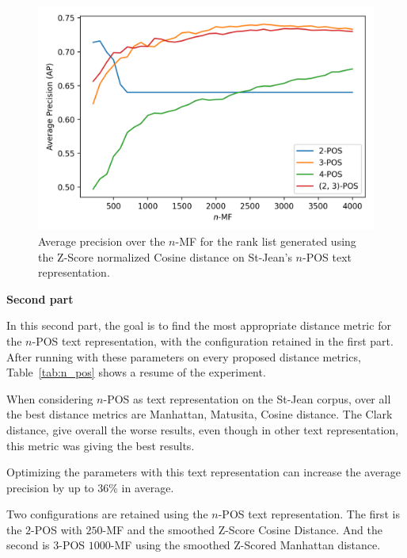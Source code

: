 \begin{figure}
  \centering
  \caption{Average precision over the $n$-MF for the rank list generated using the Z-Score normalized Cosine distance on St-Jean's $n$-POS text representation.}
  \label{fig:n_pos}
  \includegraphics[width=\linewidth]{img/n_pos.png}
\end{figure}

\textbf{Second part}

In this second part, the goal is to find the most appropriate distance metric for the $n$-POS text representation, with the configuration retained in the first part.
After running with these parameters on every proposed distance metrics, Table~\ref{tab:n_pos} shows a resume of the experiment.

When considering $n$-POS as text representation on the St-Jean corpus, over all the best distance metrics are Manhattan, Matusita, Cosine distance.
The Clark distance, give overall the worse results, even though in other text representation, this metric was giving the best results.

Optimizing the parameters with this text representation can increase the average precision by up to $36$\% in average.

Two configurations are retained using the $n$-POS text representation.
The first is the $2$-POS with $250$-MF and the smoothed Z-Score Cosine Distance.
And the second is $3$-POS $1000$-MF using the smoothed Z-Scored Manhattan distance.

